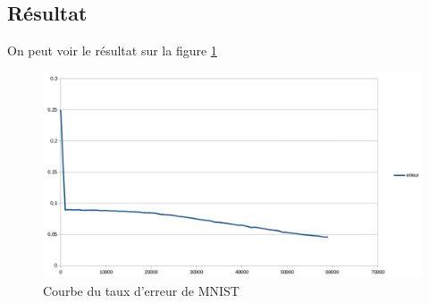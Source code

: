 \subsection{Résultat}
On peut voir le résultat sur la figure \ref{fig:res_MNIST}
\begin{figure}[h]
\begin{center}
\includegraphics[width=1\textwidth]{images/17_11_03-courbe_MNIST.png}
\caption{Courbe du taux d'erreur de MNIST}
\label{fig:res_MNIST}
\end{center}
\end{figure}
